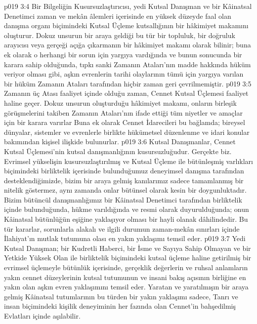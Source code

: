 \vs p019 3:4 Bir Bilgeliğin Kusursuzlaştırıcısı, yedi Kutsal Danışman ve bir Kâinatsal Denetimci zaman ve mekân âlemleri içerisinde en yüksek düzeyde faal olan danışma organı biçimindeki Kutsal Üçleme kutsallığının bir hâkimiyet makamını oluşturur. Dokuz unsurun bir araya geldiği bu tür bir topluluk, bir doğruluk arayıcısı veya gerçeği açığa çıkarmanın bir hâkimiyet makamı olarak bilinir; buna ek olarak o herhangi bir sorun için yargıya vardığında ve bunun sonucunda bir karara sahip olduğunda, tıpkı sanki Zamanın Ataları’nın madde hakkında hüküm veriyor olması gibi, aşkın evrenlerin tarihi olaylarının tümü için yargıya varılan bir hüküm Zamanın Ataları tarafından hiçbir zaman geri çevrilmemiştir.
\vs p019 3:5 Zamanın üç Atası faaliyet içinde olduğu zaman, Cennet Kutsal Üçlemesi faaliyet haline geçer. Dokuz unsurun oluşturduğu hâkimiyet makamı, onların birleşik görüşmelerini takiben Zamanın Ataları’nın ifade ettiği tüm niyetler ve amaçlar için bir karara varırlar Buna ek olarak Cennet İdarecileri bu bağlamda; bireysel dünyalar, sistemler ve evrenlerle birlikte hükümetsel düzenlenme ve idari konular bakımından kişisel ilişkide bulunurlar.
\vs p019 3:6 Kutsal Danışmanlar, Cennet Kutsal Üçlemesi’nin kutsal danışmanlığının kusursuzluğudur. Gerçekte biz. Evrimsel yükselişin kusursuzlaştırılmış ve Kutsal Üçleme ile bütünleşmiş varlıkları biçimindeki birliktelik içerisinde bulunduğumuz deneyimsel danışma tarafından desteklendiğimizde, bizim bir araya gelmiş kanılarımız sadece tamamlanmış bir nitelik göstermez, aynı zamanda onlar bütünsel olarak kesin bir doygunluktadır. Bizim bütüncül danışmanlığımız bir Kâinatsal Denetimci tarafından birliktelik içinde bulunduğunda, hükme varıldığında ve resmi olarak duyurulduğunda; onun Kâinatsal bütünlüğün eşiğine yaklaşıyor olması bir hayli olanak dâhilindedir. Bu tür kararlar, sorunlarla alakalı ve ilgili durumun zaman\hyp{}mekân sınırları içinde İlahiyat’ın mutlak tutumuna olası en yakın yaklaşımı temsil eder.
\vs p019 3:7 Yedi Kutsal Danışman; bir Kudretli Haberci, bir İsme ve Sayıya Sahip Olmayan ve bir Yetkide Yüksek Olan ile birliktelik biçimindeki kutsal üçleme haline getirilmiş bir evrimsel üçlemeyle bütünlük içerisinde, gerçeklik değerlerin ve ruhsal anlamların yakın cennet düzeylerinin kutsal tutumunun ve insani bakış açısının birliğine en yakın olan aşkın evren yaklaşımını temsil eder. Yaratan ve yaratılmışın bir araya gelmiş Kâinatsal tutumlarının bu türden bir yakın yaklaşımı sadece, Tanrı ve insan biçimindeki kişilik deneyiminin her fazında olan Cennet’in bahşedilmiş Evlatları içinde aşılabilir.
